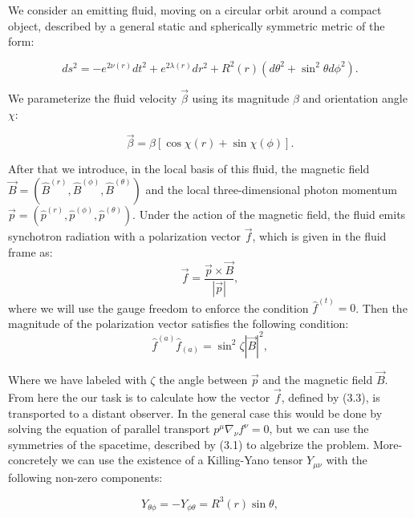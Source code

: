 \documentclass[12pt]{article}
\numberwithin{equation}{section}
\numberwithin{figure}{section}
\begin{document}
	We consider an emitting fluid, moving on a circular orbit around a compact object, described by a general static and spherically symmetric metric of the form:
	
	\begin{equation}
		ds^2 = - e^{2\nu(r)}dt^2 + e^{2\lambda(r)}dr^2 + R^2(r)\left(d\theta^2 + \sin^2\theta d\phi^2\right).
	\end{equation}
	
	\noindent We parameterize the fluid velocity $\vec{\beta}$ using its magnitude $\beta$ and orientation angle $\chi$:
	
	\begin{equation}
		\vec{\beta} = \beta\left[\cos\chi (r) + \sin\chi (\phi)\right].
	\end{equation}
	
	After that we introduce, in the local basis of this fluid, the magnetic field $\vec{B} = (\hat{B}^{(r)},\hat{B}^{(\phi)},\hat{B}^{(\theta)})$ and the local three-dimensional photon momentum $\vec{p} = \left(\hat{p}^{(r)},\hat{p}^{(\phi)},\hat{p}^{(\theta)}\right)$. Under the action of the magnetic field, the fluid emits synchotron radiation with a polarization vector $\vec{f}$, which is given in the fluid frame as:
	\begin{equation}
		\vec{f} = \frac{\vec{p}\times\vec{B}}{|\vec{p}|},
	\end{equation}
	where we will use the gauge freedom to enforce the condition $\hat{f}^{(t)} = 0$. Then the magnitude of the polarization vector satisfies the following condition:
	\begin{equation}
		\hat{f}^{(a)}\hat{f}_{(a)} = \sin^2\zeta|\vec{B}|^2,
	\end{equation}
	
	Where we have labeled with $\zeta$ the angle between $\vec{p}$ and the magnetic field $\vec{B}$. From here the our task is to calculate how the vector $\vec{f}$, defined by (3.3), is transported to a distant observer. In the general case this would be done by solving the equation of parallel transport $p^\mu\nabla_\nu f^\nu = 0$, but we can use the symmetries of the spacetime, described by (3.1) to algebrize the problem. More-concretely we can use the existence of a Killing-Yano tensor $Y_{\mu\nu}$ with the following non-zero components:
	
	\begin{equation}
		Y_{\theta\phi} = -Y_{\phi\theta} = R^3(r)\sin\theta,
	\end{equation}
	
\end{document}
